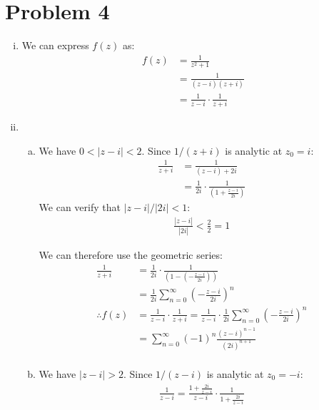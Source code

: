 \documentclass[letterpaper, titlepage, DIV=14]{scrartcl}
\begin{document}
    
    \section*{Problem 4}
   
    \begin{enumerate}[i)]
      \item
      We can express $f(z)$ as:
      \begin{align*}
        f(z) &= \frac{1}{z^{2}+1} \\
          &= \frac{1}{(z-i)(z+i)} \\
          &= \frac{1}{z-i}\cdot\frac{1}{z+i}
      \end{align*}
     
      
      \item
      \begin{enumerate}[a)]
        \item We have $0<|z-i|<2$. Since $1/(z+i)$ is analytic at $z_{0}=i$:
        \begin{align*}
          \frac{1}{z+i} &= \frac{1}{(z - i) + 2i} \\
            &= \frac{1}{2i} \cdot \frac{1}{(1 + \frac{z-i}{2i})} 
        \end{align*}
        We can verify that $|z-i|/|2i|<1$:
        \begin{gather*}
          \frac{|z-i|}{|2i|} < \frac{2}{2} = 1
        \end{gather*}
  
        We can therefore use the geometric series:
        \begin{align*}
          \frac{1}{z+i} &= \frac{1}{2i} \cdot \frac{1}{(1 - (-\frac{z-i}{2i}))} \\
            &= \frac{1}{2i} \sum_{n=0}^{\infty}(-\frac{z-i}{2i})^{n} \\
          \therefore f(z) &= \frac{1}{z-i}\cdot\frac{1}{z+i} = \frac{1}{z-i}\cdot\frac{1}{2i} \sum_{n=0}^{\infty}(-\frac{z-i}{2i})^{n} \\
          &= \sum_{n=0}^{\infty}(-1)^{n}\frac{(z-i)^{n-1}}{(2i)^{n+1}} \\
        \end{align*}
        
        
        \item We have $|z-i|>2$. Since $1/(z-i)$ is analytic at $z_{0}=-i$:
        \begin{align*}
          \frac{1}{z-i} = \frac{1 + \frac{2i}{z-i}}{z-i} \cdot \frac{1}{1+\frac{2i}{z-i}} 
        \end{align*}


\end{enumerate}
\end{enumerate}
\end{document}
